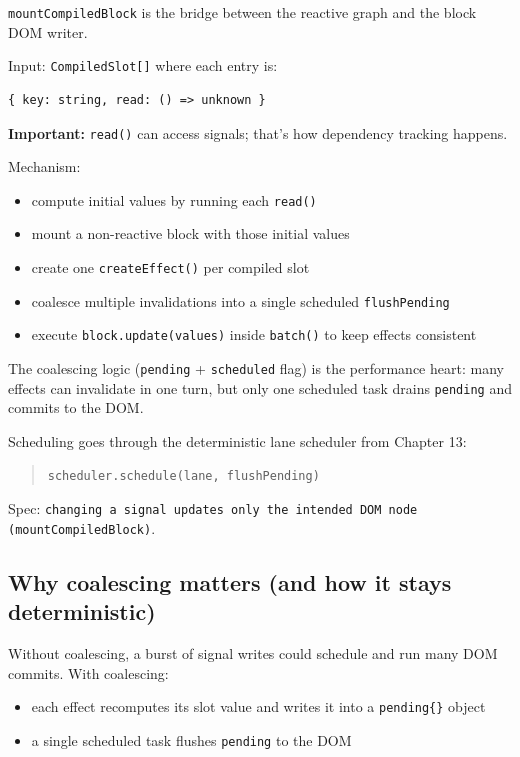\texttt{mountCompiledBlock} is the bridge between the reactive graph and the block DOM writer.

Input: \texttt{CompiledSlot[]} where each entry is:

\begin{verbatim}
{ key: string, read: () => unknown }
\end{verbatim}

\textbf{Important:} \texttt{read()} can access signals; that’s how dependency tracking happens.

Mechanism:

\begin{itemize}
  \item compute initial values by running each \texttt{read()}
  \item mount a non-reactive block with those initial values
  \item create one \texttt{createEffect()} per compiled slot
  \item coalesce multiple invalidations into a single scheduled \texttt{flushPending}
  \item execute \texttt{block.update(values)} inside \texttt{batch()} to keep effects consistent
\end{itemize}

The coalescing logic (\texttt{pending} + \texttt{scheduled} flag) is the performance heart: many effects can invalidate in one turn, but only one scheduled task drains \texttt{pending} and commits to the DOM.

Scheduling goes through the deterministic lane scheduler from Chapter 13:

\begin{quote}
	\texttt{scheduler.schedule(lane, flushPending)}
\end{quote}

Spec: \texttt{changing a signal updates only the intended DOM node (mountCompiledBlock)}.

\subsection{Why coalescing matters (and how it stays deterministic)}

Without coalescing, a burst of signal writes could schedule and run many DOM commits.
With coalescing:

\begin{itemize}
  \item each effect recomputes its slot value and writes it into a \texttt{pending\{\}} object
  \item a single scheduled task flushes \texttt{pending} to the DOM
\end{itemize}

